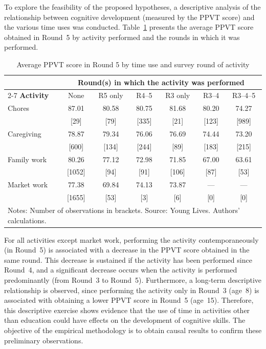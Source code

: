 \documentclass[12pt]{article}
\begin{document}
To explore the feasibility of the proposed hypotheses, a descriptive analysis
of the relationship between cognitive development (measured by the PPVT score)
and the various time uses was conducted. Table~\ref{tab:descriptive} presents
the average PPVT score obtained in Round~5 by activity performed and the
rounds in which it was performed.

\begin{table}[ht]
\centering
\caption{Average PPVT score in Round 5 by time use and survey round of
activity}
\label{tab:descriptive}
\begin{tabular}{lcccccc}
\toprule
 & \multicolumn{6}{c}{\textbf{Round(s) in which the activity was performed}} \\
\cmidrule(lr){2-7}
\textbf{Activity} & None & R5 only & R4--5 & R3 only & R3--4 & R3--4--5 \\
\midrule
Chores
  & 87.01 & 80.58 & 80.75 & 81.68 & 80.20 & 74.27 \\
  & [29]  & [79]  & [335] & [21]  & [123] & [989] \\
\addlinespace
Caregiving
  & 78.87 & 79.34 & 76.06 & 76.69 & 74.44 & 73.20 \\
  & [600] & [134] & [244] & [89]  & [183] & [215] \\
\addlinespace
Family work
  & 80.26 & 77.12 & 72.98 & 71.85 & 67.00 & 63.61 \\
  & [1052]& [94]  & [91]  & [106] & [87]  & [53]  \\
\addlinespace
Market work
  & 77.38 & 69.84 & 74.13 & 73.87 &  ---  &  ---  \\
  & [1655]& [53]  & [3]   & [6]   & [0]   & [0]   \\
\bottomrule
\multicolumn{7}{l}{\footnotesize Notes: Number of observations in brackets.
Source: Young Lives. Authors' calculations.}
\end{tabular}
\end{table}

For all activities except market work, performing the activity contemporaneously
(in Round~5) is associated with a decrease in the PPVT score obtained in the
same round. This decrease is sustained if the activity has been performed since
Round~4, and a significant decrease occurs when the activity is performed
predominantly (from Round~3 to Round~5). Furthermore, a long-term descriptive
relationship is observed, since performing the activity only in Round~3 (age~8)
is associated with obtaining a lower PPVT score in Round~5 (age~15). Therefore,
this descriptive exercise shows evidence that the use of time in activities
other than education could have effects on the development of cognitive skills.
The objective of the empirical methodology is to obtain causal results to
confirm these preliminary observations.
\end{document}
